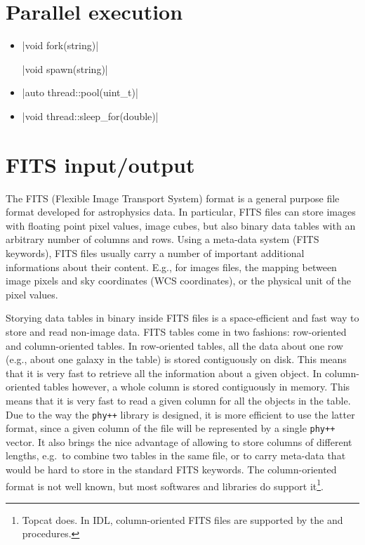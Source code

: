 \documentclass[12pt]{report}
\newcommand{\phypp}{\texttt{phy++}\xspace}
\begin{document}
\section{Parallel execution \label{SEC:support:thread}}

\begin{itemize}
\item \cppinline|void fork(string)| 

\cppinline|void spawn(string)| 

\item \cppinline|auto thread::pool(uint_t)| 

\item \cppinline|void thread::sleep_for(double)| 
\end{itemize}

\section{FITS input/output \label{SEC:support:fits}}

The FITS (Flexible Image Transport System) format is a general purpose file format developed for astrophysics data. In particular, FITS files can store images with floating point pixel values, image cubes, but also binary data tables with an arbitrary number of columns and rows. Using a meta-data system (FITS keywords), FITS files usually carry a number of important additional informations about their content. E.g., for images files, the mapping between image pixels and sky coordinates (WCS coordinates), or the physical unit of the pixel values.

Storying data tables in binary inside FITS files is a space-efficient and fast way to store and read non-image data. FITS tables come in two fashions: row-oriented and column-oriented tables. In row-oriented tables, all the data about one row (e.g., about one galaxy in the table) is stored contiguously on disk. This means that it is very fast to retrieve all the information about a given object. In column-oriented tables however, a whole column is stored contiguously in memory. This means that it is very fast to read a given column for all the objects in the table. Due to the way the \phypp library is designed, it is more efficient to use the latter format, since a given column of the file will be represented by a single \phypp vector. It also brings the nice advantage of allowing to store columns of different lengths, e.g.~to combine two tables in the same file, or to carry meta-data that would be hard to store in the standard FITS keywords. The column-oriented format is not well known, but most softwares and libraries do support it\footnote{Topcat does. In IDL, column-oriented FITS files are supported by the  and  procedures.}.
\end{document}

